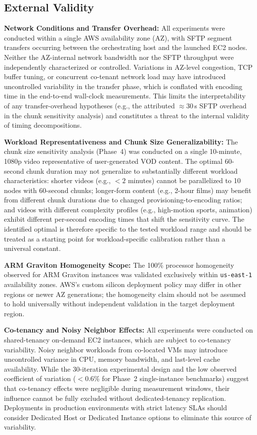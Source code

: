 \documentclass[conference]{IEEEtran}
\begin{document}
\subsection{External Validity}

\textbf{Network Conditions and Transfer Overhead:} All experiments were conducted within a single AWS availability zone (AZ), with SFTP segment transfers occurring between the orchestrating host and the launched EC2 nodes. Neither the AZ-internal network bandwidth nor the SFTP throughput were independently characterized or controlled. Variations in AZ-level congestion, TCP buffer tuning, or concurrent co-tenant network load may have introduced uncontrolled variability in the transfer phase, which is conflated with encoding time in the end-to-end wall-clock measurements. This limits the interpretability of any transfer-overhead hypotheses (e.g., the attributed $\approx$30\,s SFTP overhead in the chunk sensitivity analysis) and constitutes a threat to the internal validity of timing decompositions.

\textbf{Workload Representativeness and Chunk Size Generalizability:} The chunk size sensitivity analysis (Phase~4) was conducted on a single 10-minute, 1080p video representative of user-generated VOD content. The optimal 60-second chunk duration may not generalize to substantially different workload characteristics: shorter videos (e.g., $<2$ minutes) cannot be parallelized to 10 nodes with 60-second chunks; longer-form content (e.g., 2-hour films) may benefit from different chunk durations due to changed provisioning-to-encoding ratios; and videos with different complexity profiles (e.g., high-motion sports, animation) exhibit different per-second encoding times that shift the sensitivity curve. The identified optimal is therefore specific to the tested workload range and should be treated as a starting point for workload-specific calibration rather than a universal constant.

\textbf{ARM Graviton Homogeneity Scope:} The 100\% processor homogeneity observed for ARM Graviton instances was validated exclusively within \texttt{us-east-1} availability zones. AWS's custom silicon deployment policy may differ in other regions or newer AZ generations; the homogeneity claim should not be assumed to hold universally without independent validation in the target deployment region.

\textbf{Co-tenancy and Noisy Neighbor Effects:} All experiments were conducted on shared-tenancy on-demand EC2 instances, which are subject to co-tenancy variability. Noisy neighbor workloads from co-located VMs may introduce uncontrolled variance in CPU, memory bandwidth, and last-level cache availability. While the 30-iteration experimental design and the low observed coefficient of variation ($<$0.6\% for Phase~2 single-instance benchmarks) suggest that co-tenancy effects were negligible during measurement windows, their influence cannot be fully excluded without dedicated-tenancy replication. Deployments in production environments with strict latency SLAs should consider Dedicated Host or Dedicated Instance options to eliminate this source of variability.
\end{document}
